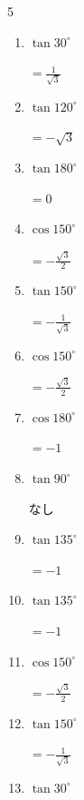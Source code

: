 \begin{multicols}{5}
\begin{enumerate}
        $\displaystyle =0$

  \item $\displaystyle \tan{30^\circ}$

        $\displaystyle =\frac{1}{\sqrt{3}}$

  \item $\displaystyle \tan{120^\circ}$

        $\displaystyle =-\sqrt{3}$

  \item $\displaystyle \tan{180^\circ}$

        $\displaystyle =0$

  \item $\displaystyle \cos{150^\circ}$

        $\displaystyle =-\frac{\sqrt{3}}{2}$

  \item $\displaystyle \tan{150^\circ}$

        $\displaystyle =-\frac{1}{\sqrt{3}}$

  \item $\displaystyle \cos{150^\circ}$

        $\displaystyle =-\frac{\sqrt{3}}{2}$

  \item $\displaystyle \cos{180^\circ}$

        $\displaystyle =-1$

  \item $\displaystyle \tan{90^\circ}$

        $\displaystyle なし$

  \item $\displaystyle \tan{135^\circ}$

        $\displaystyle =-1$

\columnbreak %

  \item $\displaystyle \tan{135^\circ}$

        $\displaystyle =-1$

  \item $\displaystyle \cos{150^\circ}$

        $\displaystyle =-\frac{\sqrt{3}}{2}$

  \item $\displaystyle \tan{150^\circ}$

        $\displaystyle =-\frac{1}{\sqrt{3}}$

  \item $\displaystyle \tan{30^\circ}$


\end{enumerate}
\end{multicols}
